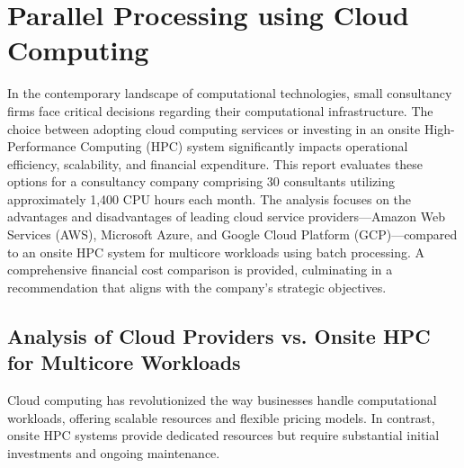 \documentclass{article}
\begin{document}
\begin{cwauthorlist}
\end{cwauthorlist}

\section{Parallel Processing using Cloud Computing}

In the contemporary landscape of computational technologies, small consultancy firms face critical decisions regarding their computational infrastructure. The choice between adopting cloud computing services or investing in an onsite High-Performance Computing (HPC) system significantly impacts operational efficiency, scalability, and financial expenditure. This report evaluates these options for a consultancy company comprising 30 consultants utilizing approximately 1,400 CPU hours each month. The analysis focuses on the advantages and disadvantages of leading cloud service providers---Amazon Web Services (AWS), Microsoft Azure, and Google Cloud Platform (GCP)---compared to an onsite HPC system for multicore workloads using batch processing. A comprehensive financial cost comparison is provided, culminating in a recommendation that aligns with the company's strategic objectives.

\subsection{Analysis of Cloud Providers vs. Onsite HPC for Multicore Workloads}

Cloud computing has revolutionized the way businesses handle computational workloads, offering scalable resources and flexible pricing models. In contrast, onsite HPC systems provide dedicated resources but require substantial initial investments and ongoing maintenance.
\end{document}
